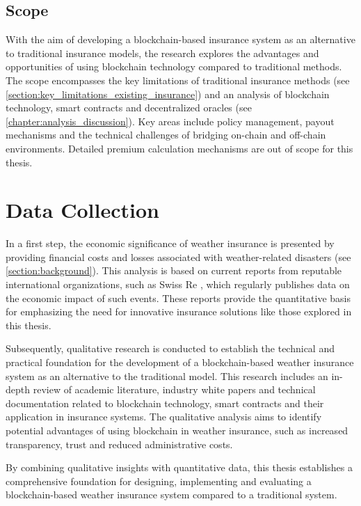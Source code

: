 \subsection{Scope}
With the aim of developing a blockchain-based insurance system as an alternative to traditional insurance models, the research explores the advantages and opportunities of using blockchain technology compared to traditional methods. The scope encompasses the key limitations of traditional insurance methods (see \cref{section:key_limitations_existing_insurance}) and an analysis of blockchain technology, smart contracts and decentralized oracles (see \cref{chapter:analysis_discussion}). Key areas include policy management, payout mechanisms and the technical challenges of bridging on-chain and off-chain environments. Detailed premium calculation mechanisms are out of scope for this thesis.

\section{Data Collection}\label{section:data_collection}
In a first step, the economic significance of weather insurance is presented by providing financial costs and losses associated with weather-related disasters (see \cref{section:background}). This analysis is based on current reports from reputable international organizations, such as Swiss Re \autocite{swissre2017}, which regularly publishes data on the economic impact of such events. These reports provide the quantitative basis for emphasizing the need for innovative insurance solutions like those explored in this thesis.

Subsequently, qualitative research is conducted to establish the technical and practical foundation for the development of a blockchain-based weather insurance system as an alternative to the traditional model. This research includes an in-depth review of academic literature, industry white papers and technical documentation related to blockchain technology, smart contracts and their application in insurance systems. The qualitative analysis aims to identify potential advantages of using blockchain in weather insurance, such as increased transparency, trust and reduced administrative costs.

By combining qualitative insights with quantitative data, this thesis establishes a comprehensive foundation for designing, implementing and evaluating a blockchain-based weather insurance system compared to a traditional system.

